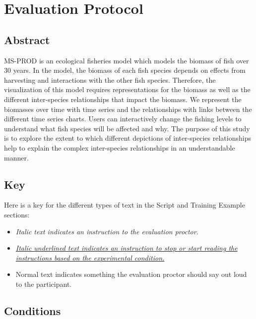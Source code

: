 \chapter{Evaluation Protocol}

{\setlength{\parskip}{1em} {\setlength{\parindent}{0cm}
{\singlespacing

\section{Abstract}

MS-PROD is an ecological fisheries model which models the biomass of fish over 30 years.  In the model, the biomass of each fish species depends on effects from harvesting and interactions with the other fish species.  Therefore, the visualization of this model requires representations for the biomass as well as the different inter-species relationships that impact the biomass.  We represent the biomasses over time with time series and the relationships with links between the different time series charts.  Users can interactively change the fishing levels to understand what fish species will be affected and why.  The purpose of this study is to explore the extent to which different depictions of inter-species relationships help to explain the complex inter-species relationships in an understandable manner.

\section{Key}

Here is a key for the different types of text in the Script and Training Example sections:

\begin{itemize}
\item \textit{Italic text indicates an instruction to the evaluation proctor.}
\item \textit{\underline{Italic underlined text indicates an instruction to stop or start reading the} \\ \underline{instructions based on the experimental condition.}}
\item Normal text indicates something the evaluation proctor should say out loud to the participant. 
\end{itemize}

\section{Conditions}

}}}
